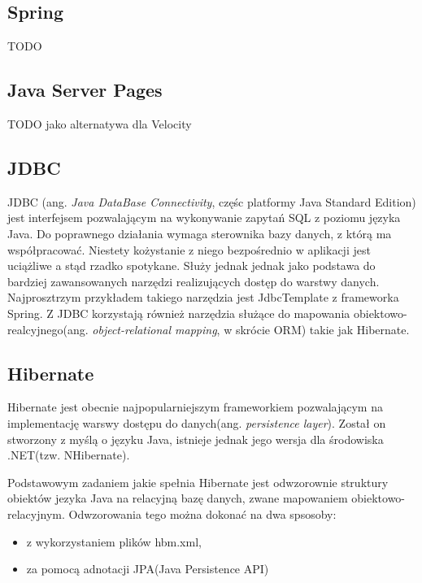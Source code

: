 \subsection[Spring][Spring]{Spring}
TODO

\subsection[Java Server Pages][Java Server Pages]{Java Server Pages}
TODO jako alternatywa dla Velocity

\subsection[JDBC][JDBC]{JDBC}
JDBC (ang. \textit{Java DataBase Connectivity}, częśc platformy Java Standard Edition) jest interfejsem pozwalającym na wykonywanie zapytań SQL z poziomu języka Java. Do poprawnego działania wymaga sterownika bazy danych, z którą ma współpracować. Niestety kożystanie z niego bezpośrednio w aplikacji jest uciążliwe a stąd rzadko spotykane. Służy jednak jednak jako podstawa do bardziej zawansowanych narzędzi realizujących dostęp do warstwy danych. Najprosztrzym przykładem takiego narzędzia jest JdbcTemplate z frameworka Spring. Z JDBC korzystają również narzędzia służące do mapowania obiektowo-realcyjnego(ang. \textit{object-relational mapping}, w skrócie ORM) takie jak Hibernate.

\subsection[Hibernate][Hibernate]{Hibernate}
Hibernate jest obecnie najpopularniejszym frameworkiem pozwalającym na implementację warswy dostępu do danych(ang. \textit{persistence layer}). Został on stworzony z myślą o języku Java, istnieje jednak jego wersja dla środowiska .NET(tzw. NHibernate).

Podstawowym zadaniem jakie spełnia Hibernate jest odwzorownie struktury obiektów jezyka Java na relacyjną bazę danych, zwane mapowaniem obiektowo-relacyjnym. Odwzorowania tego można dokonać na dwa spsosoby:
\begin{itemize}
	\item z wykorzystaniem plików hbm.xml,
	\item za pomocą adnotacji JPA(Java Persistence API)
\end{itemize}

